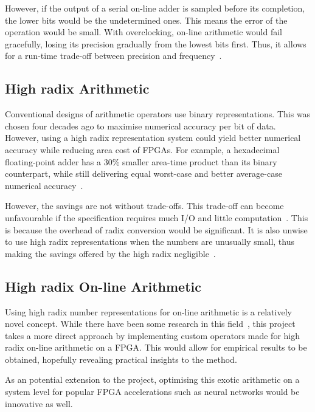 \documentclass[journal]{IEEEtran}
\begin{document}
However, if the output of a serial on-line adder is sampled before its
completion, the lower bits would be the undetermined ones.
This means the error of the operation would be small.
With overclocking, on-line arithmetic would fail gracefully, losing its
precision gradually from the lowest bits first.
Thus, it allows for a run-time trade-off between precision and
frequency~\cite{Shi2}.

\subsection{High radix Arithmetic}
Conventional designs of arithmetic operators use binary representations.
This was chosen four decades ago to maximise numerical accuracy per bit of data.
However, using a high radix representation system could yield better numerical
accuracy while reducing area cost of FPGAs.
For example, a hexadecimal floating-point adder has a 30\% smaller area-time
product than its binary counterpart, while still delivering equal worst-case
and better average-case numerical accuracy~\cite{Catanzaro1}.

However, the savings are not without trade-offs.
This trade-off can become unfavourable if the specification requires much I/O
and little computation~\cite{Whyte1}.
This is because the overhead of radix conversion would be significant.
It is also unwise to use high radix representations when the numbers are
unusually small, thus making the savings offered by the high radix
negligible~\cite{Catanzaro1}.

\subsection{High radix On-line Arithmetic}
Using high radix number representations for on-line arithmetic is a
relatively novel concept.
While there have been some research in this field~\cite{Lynch1}\cite{Lynch2},
this project takes a more direct approach by implementing custom operators
made for high radix on-line arithmetic on a FPGA.
This would allow for empirical results to be obtained, hopefully revealing
practical insights to the method.

As an potential extension to the project, optimising this exotic arithmetic
on a system level for popular FPGA accelerations such as neural networks would
be innovative as well.

\end{document}
